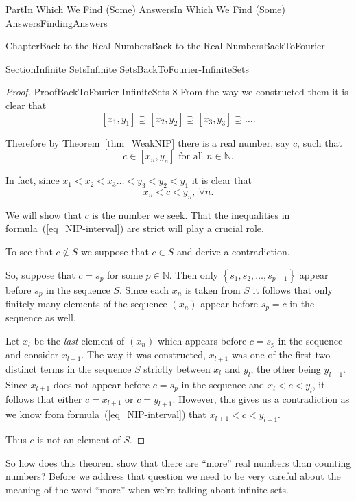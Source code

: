 \documentclass[oneside,10pt,]{book}
\newcommand{\xreffont}{\relax}
\numberwithin{equation}{part}
\newcommand{\NN}{\mathbb {N}}
\newcommand{\lt}{<}
\begin{document}
\begin{partptx}{Part}{In Which We Find (Some) Answers}{}{In Which We Find (Some) Answers}{}{}{FindingAnswers}
\begin{chapterptx}{Chapter}{Back to the Real Numbers}{}{Back to the Real Numbers}{}{}{BackToFourier}
\begin{sectionptx}{Section}{Infinite Sets}{}{Infinite Sets}{}{}{BackToFourier-InfiniteSets}
\begin{proof}{Proof}{}{BackToFourier-InfiniteSets-8}
From the way we constructed them it is clear that%
\begin{equation*}
\left[x_1, y_1\right] \supseteq \left[x_2, y_2\right]
\supseteq \left[x_3, y_3\right] \supseteq \ldots \text{.}
\end{equation*}
%
\par
Therefore by \hyperref[thm_WeakNIP]{Theorem~{\xreffont\ref{thm_WeakNIP}}} there is a real number, say \(c\), such that%
\begin{equation*}
c\in\left[x_n,
y_n\right] \text{ for all } n\in\NN \text{.}
\end{equation*}
%
\par
In fact, since \(x_1\lt x_2\lt x_3\ldots\lt y_3\lt y_2\lt
y_1\) it is clear that%
\begin{equation}
x_n\lt c\lt y_n, \ \forall n\text{.}\label{eq_NIP-interval}
\end{equation}
%
\par
We will show that \(c\) is the number we seek.  That the inequalities in \hyperref[eq_NIP-interval]{formula~({\xreffont\ref{eq_NIP-interval}})} are strict will play a crucial role.%
\par
To see that \(c\not\in S\) we suppose that \(c\in S\) and derive a contradiction.%
\par
So, suppose that \(c=s_p\) for some \(p\in\NN\).  Then only \(\left\{s_1, s_2,\ldots, s_{p-1}\right\}\) appear before \(s_p\) in the sequence \(S\).  Since each \(x_n\) is taken from \(S\) it follows that only finitely many elements of the sequence \((x_n)\) appear before \(s_p=c\) in the sequence as well.%
\par
Let \(x_l\) be the \emph{last} element of \((x_n)\) which appears before \(c=s_p\) in the sequence and consider \(x_{l+1}\).  The way it was constructed, \(x_{l+1}\) was one of the first two distinct terms in the sequence \(S\) strictly between \(x_l\) and \(y_l\), the other being \(y_{l+1}\).  Since \(x_{l+1}\) does not appear before \(c=s_p\) in the sequence and \(x_l\lt c\lt
y_l\), it follows that either \(c=x_{l+1}\) or \(c=y_{l+1}\).  However, this gives us a contradiction as we know from \hyperref[eq_NIP-interval]{formula~({\xreffont\ref{eq_NIP-interval}})} that \(x_{l+1}\lt c\lt y_{l+1}\).%
\par
Thus \(c\) is not an element of \(S\).%
\end{proof}
So how does this theorem show that there are ``more'' real numbers than counting numbers?  Before we address that question we need to be very careful about the meaning of the word ``more'' when we're talking about infinite sets.%

\end{sectionptx}
\end{chapterptx}
\end{partptx}
\end{document}
